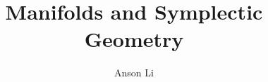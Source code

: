 \author{Anson Li}
\title{Manifolds and Symplectic Geometry}


\pagestyle{fancy}
\fancyhead{}\fancyfoot{}
\setlength{\headheight}{52pt} %
\renewcommand{\footrulewidth}{0.4pt}%

\fancyhead[R]{%
\small\rightmark
}


%
%
%


\providecommand{\symatrix}{\begin{bmatrix}
    0 & 1 \\ -1 & 0
\end{bmatrix}}
\providecommand{\sybasis}{\begin{bmatrix}
    e_i & e_{n+i}
\end{bmatrix}}
\providecommand{\sysmallmatrix}{
\begin{bsmallmatrix}
        0 & 1 \\ -1 & 0
    \end{bsmallmatrix}}
\providecommand{\sysmallbasis}{
\begin{bsmallmatrix}
        e_i & e_{n+i}
    \end{bsmallmatrix}}
\newcommand{\bigdot}[1]{\overset{\bullet}{#1}}
\providecommand{\realtn}{{\real^{2n}}}
\providecommand{\omegao}{\omega_0}
